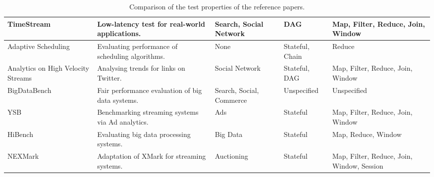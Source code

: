 \begin{table}[H]
{\begin{tabular}{|p{3cm}|p{4cm}|p{3cm}|p{2.5cm}|p{2.5cm}|}
      TimeStream\cite{timestream}
      & Low-latency test for real-world applications.
      & Search, Social Network
      & DAG
      & Map, Filter, Reduce, Join, Window
      \\\hline

      Adaptive Scheduling\cite{storm}
      & Evaluating performance of scheduling algorithms.
      & None
      & Stateful, Chain
      & Reduce
      \\\hline

      Analytics on High Velocity Streams\cite{storm2}
      & Analysing trends for links on Twitter.
      & Social Network
      & Stateful, DAG
      & Map, Filter, Reduce, Join, Window
      \\\hline

      BigDataBench\cite{bigdatabench}
      & Fair performance evaluation of big data systems.
      & Search, Social, Commerce
      & Unspecified
      & Unspecified
      \\\hline

      YSB\cite{ysb}
      & Benchmarking streaming systems via Ad analytics.
      & Ads
      & Stateful
      & Map, Filter, Reduce, Join, Window
      \\\hline

      HiBench\cite{hibench}
      & Evaluating big data processing systems.
      & Big Data
      & Stateful
      & Map, Reduce, Window
      \\\hline

      NEXMark\cite{nexmark}
      & Adaptation of XMark for streaming systems.
      & Auctioning
      & Stateful
      & Map, Filter, Reduce, Join, Window, Session
      \\\hline
    \end{tabular}
  }
  \caption{Comparison of the test properties of the reference papers.}
  \label{table:test-properties}
\end{table}

